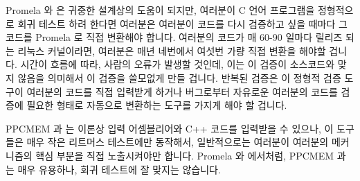 Promela 와  은 귀중한 설계상의 도움이 되지만, 여러분이 C 언어
프로그램을 정형적으로 회귀 테스트 하려 한다면 여러분은 여러분이 코드를 다시
검증하고 싶을 때마다 그 코드를 Promela 로 직접 변환해야 합니다.
여러분의 코드가 매 60-90 일마다 릴리즈 되는 리눅스 커널이라면, 여러분은 매년
네번에서 여섯번 가량 직접 변환을 해야할 겁니다.
시간이 흐름에 따라, 사람의 오류가 발생할 것인데, 이는 이 검증이 소스코드와 맞지
않음을 의미해서 이 검증을 쓸모없게 만들 겁니다.
반복된 검증은 이 정형적 검증 도구이 여러분의 코드를 직접 입력받게 하거나
버그로부터 자유로운 여러분의 코드를 검증에 필요한 형태로 자동으로 변환하는
도구를 가지게 해야 할 겁니다.

\iffalse

Although Promela and \co{spin}
are invaluable design aids, if you need to formally regression-test
your C-language program, you must hand-translate to Promela each time
you would like to re-verify your code.
If your code happens to be in the Linux kernel, which releases every
60--90 days, you will need to hand-translate from four to six times
each year.
Over time, human error will creep in, which means that the verification
won't match the source code, rendering the verification useless.
Repeated verification clearly requires either that the formal-verification
tooling input your code directly, or that there be bug-free automatic
translation of your code to the form required for verification.

\fi

PPCMEM 과  는 이론상 입력 어셈블리어와 C++ 코드를 입력받을 수 있으나,
이 도구들은 매우 작은 리트머스 테스트에만 동작해서, 일반적으로는 여러분이
여러분의 메커니즘의 핵심 부분을 직접 노출시켜야만 합니다.
Promela 와  에서처럼, PPCMEM 과  는 매우 유용하나, 회귀
테스트에 잘 맞지는 않습니다.

\iffalse

PPCMEM and \co{herd} can in theory directly input assembly language
and C++ code, but these tools work only on very small litmus tests,
which normally means that you must extract the core of your
mechanism---by hand.
As with Promela and \co{spin}, both PPCMEM and \co{herd} are
extremely useful, but they are not well-suited for regression suites.

\fi

